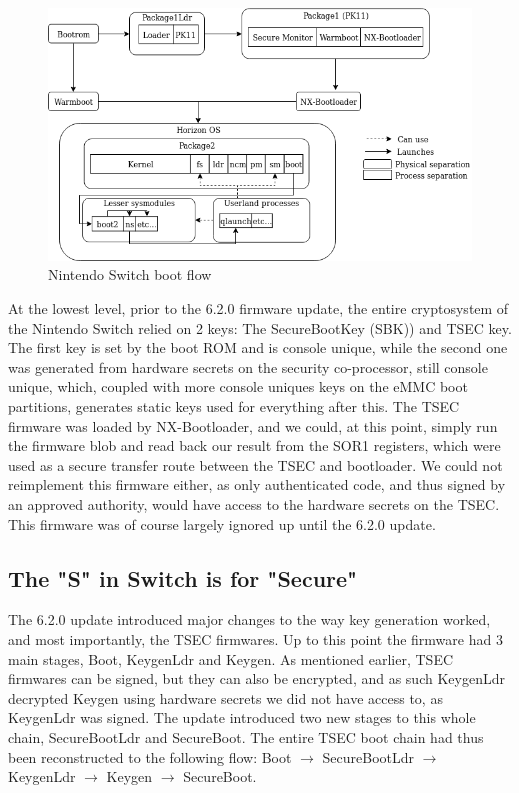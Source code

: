 \documentclass[journal]{IEEEtran}
\begin{document}
\begin{figure}[ht]
  \includegraphics[width=\columnwidth]{bootflow}
    \caption{Nintendo Switch boot flow}
\end{figure}


At the lowest level, prior to the 6.2.0 firmware update, the entire cryptosystem of the Nintendo
Switch relied on 2 keys: The SecureBootKey (SBK)) and TSEC key. The first
key is set by the boot ROM and is console unique, while the second one was generated from
hardware secrets on the security co-processor, still console unique, which, coupled with 
more console uniques keys on the eMMC boot partitions, generates static keys used for 
everything after this. The TSEC firmware was loaded by NX-Bootloader, and we could, at this 
point, simply run the firmware blob and read back our result from 
the SOR1 registers, which were used as a secure transfer route
between the TSEC and bootloader. We could not reimplement this firmware either, as only
authenticated code, and thus signed by an approved authority, would have access to the hardware
secrets on the TSEC. This firmware was of course largely ignored up until the 6.2.0 update.

\subsection{The "S" in Switch is for "Secure"}

The 6.2.0 update introduced major changes to the way key generation worked, and most
importantly, the TSEC firmwares. Up to this point the firmware had 3 main stages,
Boot, KeygenLdr and Keygen. As mentioned earlier, TSEC firmwares can be signed,
but they can also be encrypted, and as such KeygenLdr decrypted Keygen using
hardware secrets we did not have access to, as KeygenLdr was signed.
The update introduced two new stages to this whole chain, SecureBootLdr and
SecureBoot. The entire TSEC boot chain had thus been reconstructed to the following flow:
Boot $\rightarrow$ SecureBootLdr $\rightarrow$ KeygenLdr $\rightarrow$ Keygen $\rightarrow$
SecureBoot. 
\end{document}
